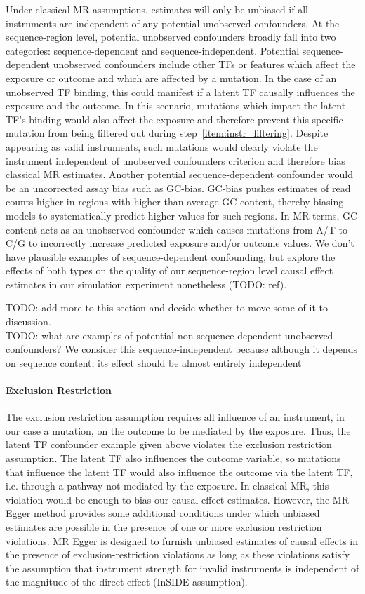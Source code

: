 Under classical MR assumptions, estimates will only be unbiased if all instruments are independent of any potential unobserved confounders. At the sequence-region level, potential unobserved confounders broadly fall into two categories: sequence-dependent and sequence-independent. Potential sequence-dependent unobserved confounders include other TFs or features which affect the exposure or outcome and which are affected by a mutation. In the case of an unobserved TF binding, this could manifest if a latent TF causally influences the exposure and the outcome. In this scenario, mutations which impact the latent TF's binding would also affect the exposure and therefore prevent this specific mutation from being filtered out during step~\ref{item:instr_filtering}. Despite appearing as valid instruments, such mutations would clearly violate the instrument independent of unobserved confounders criterion and therefore bias classical MR estimates. Another potential sequence-dependent confounder would be an uncorrected assay bias such as GC-bias. GC-bias pushes estimates of read counts higher in regions with higher-than-average GC-content, thereby biasing models to systematically predict higher values for such regions. In MR terms, GC content acts as an unobserved confounder which causes mutations from A/T to C/G to incorrectly increase predicted exposure and/or outcome values. We don't have plausible examples of sequence-dependent confounding, but explore the effects of both types on the quality of our sequence-region level causal effect estimates in our simulation experiment nonetheless (TODO: ref).


\noindent TODO: add more to this section and decide whether to move some of it to discussion.\\
TODO: what are examples of potential non-sequence dependent unobserved confounders? We consider this sequence-independent because although it depends on sequence content, its effect should be almost entirely independent 

\paragraph{Exclusion Restriction}
The exclusion restriction assumption requires all influence of an instrument, in our case a mutation, on the outcome to be mediated by the exposure. Thus, the latent TF confounder example given above violates the exclusion restriction assumption. The latent TF also influences the outcome variable, so mutations that influence the latent TF would also influence the outcome via the latent TF, i.e. through a pathway not mediated by the exposure. In classical MR, this violation would be enough to bias our causal effect estimates. However, the MR Egger method provides some additional conditions under which unbiased estimates are possible in the presence of one or more exclusion restriction violations. MR Egger is designed to furnish unbiased estimates of causal effects in the presence of exclusion-restriction violations as long as these violations satisfy the assumption that instrument strength for invalid instruments is independent of the magnitude of the direct effect (InSIDE assumption).

